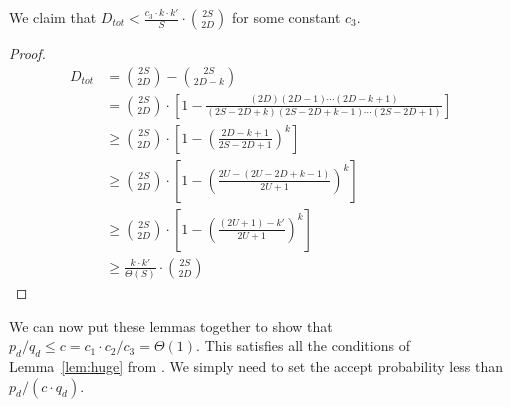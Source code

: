 \begin{lemma}
We claim that $D_{tot} < \frac{c_3\cdot k\cdot k'}{S}\cdot{{2S}\choose{2D}}$ for some constant $c_3$.
\end{lemma}
\begin{proof}
\begin{align}
D_{tot} &= {{2S}\choose{2D}}-{{2S}\choose{2D-k}}\\
&= {{2S}\choose{2D}}\cdot \left[1-\frac{(2D)(2D-1)\cdots(2D-k+1)}{(2S-2D+k)(2S-2D+k-1)\cdots(2S-2D+1)}\right]\\
&\ge {{2S}\choose{2D}}\cdot \left[1-\left(\frac{2D-k+1}{2S-2D+1}\right)^k\right]\\
&\ge {{2S}\choose{2D}}\cdot \left[1-\left(\frac{2U-(2U-2D+k-1)}{2U+1}\right)^k\right]\\
&\ge {{2S}\choose{2D}}\cdot \left[1-\left(\frac{(2U+1)-k'}{2U+1}\right)^k\right]\\
&\ge \frac{k\cdot k'}{\Theta(S)}\cdot{{2S}\choose{2D}}
\end{align}
\end{proof}

\begin{theorem}
We can now put these lemmas together to show that $p_d/q_d \le c = c_1\cdot c_2/c_3 = \Theta(1)$.
This satisfies all the conditions of Lemma~\ref{lem:huge} from \cite{huge}.
We simply need to set the accept probability less than $p_d/(c\cdot q_d)$.
\end{theorem}
